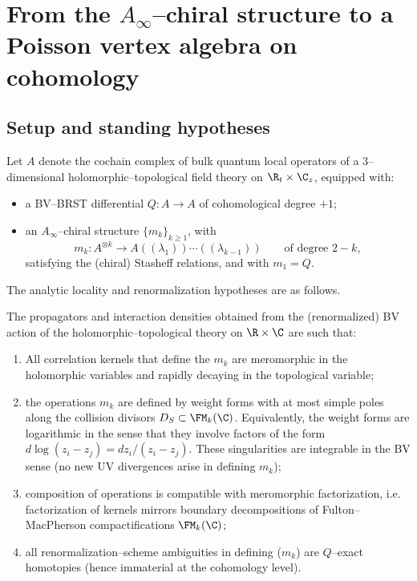 \section{From the $A_\infty$–chiral structure to a Poisson vertex algebra on cohomology}

\subsection{Setup and standing hypotheses}

Let $A$ denote the cochain complex of bulk quantum local operators of a $3$–dimensional holomorphic–topological field theory on $\R_t\times \C_z$, equipped with:
\begin{itemize}[leftmargin=2em]
 \item a BV–BRST differential $Q\colon A\to A$ of cohomological degree $+1$;
 \item an $A_\infty$–chiral structure $\{m_k\}_{k\ge1}$, with
 \begin{equation}
 m_k \colon A^{\otimes k} \longrightarrow A((\lambda_1))\cdots((\lambda_{k-1})) \qquad\text{of degree } 2-k,
 \end{equation}
 satisfying the (chiral) Stasheff relations, and with $m_1=Q$.
\end{itemize}

The analytic locality and renormalization hypotheses are as follows.

\begin{assumption}
The propagators and interaction densities obtained from the (renormalized) BV action of the holomorphic–topological theory on $\R\times \C$ are such that:
\begin{enumerate}[label=(H\arabic*),leftmargin=2em]
 \item All correlation kernels that define the $m_k$ are meromorphic in the holomorphic variables and rapidly decaying in the topological variable;
 \item the operations $m_k$ are defined by weight forms with at most simple poles along the collision divisors $D_S \subset \FM_k(\C)$. Equivalently, the weight forms are logarithmic in the sense that they involve factors of the form $d\log(z_i - z_j) = dz_i/(z_i - z_j)$. These singularities are integrable in the BV sense (no new UV divergences arise in defining $m_k$);
 \item composition of operations is compatible with meromorphic factorization, i.e. factorization of kernels mirrors boundary decompositions of Fulton–MacPherson compactifications $\FM_k(\C)$;
 \item all renormalization–scheme ambiguities in defining ($m_k$) are $Q$–exact homotopies (hence immaterial at the cohomology level).
\end{enumerate}
\end{assumption}

